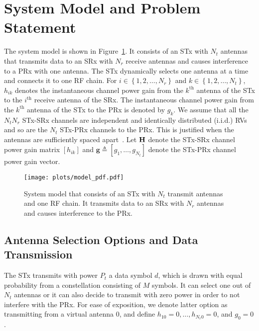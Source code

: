 \documentclass[12pt,draftcls,peerreview,onecolumn]{IEEEtran}
\newcommand{\define}{\triangleq}
\newcommand{\mtx}[1]{{\bf #1}} %
\newcommand{\nx}{{0}}
\newcommand{\Nt}{{N_t}}
\newcommand{\Nr}{{N_r}}
\newcommand{\Pt}{{P_t}}
\newcommand{\such}{h}
\newcommand{\puch}{g}
\newcommand{\hk}[1]{{\such_{#1}}}
\newcommand{\gk}[1]{{\puch_{#1}}}
\newcommand{\g}{\mathbf{\puch}}
\newcommand{\antopts}{\left\{1,2,\ldots,\Nt\right\}}
\newcommand{\nropts}{\left\{1,2,\ldots,\Nr\right\}}
\newcommand{\Hmx}{\mtx{H}}
\newcommand{\ith}{i^{\text{th}}}
\newcommand{\kth}{k^{\text{th}}}
\begin{document}
\section{System Model and Problem Statement}
\label{sec:model}
The system model is shown in Figure~\ref{fig:MODEL}. It consists of an STx with $\Nt$ antennas that transmits data to an SRx with $\Nr$ receive antennas and causes interference to a PRx with one antenna. The STx dynamically selects one antenna at a time and connects it to one RF chain. For $i \in \nropts$ and $k \in \antopts$, $\hk{ik}$ denotes the instantaneous channel power gain from the $\kth$ antenna of the STx to the $\ith$ receive antenna of the SRx. The instantaneous channel power gain from the $\kth$ antenna of the STx to the PRx is denoted by $\gk{k}$. We assume that all the $\Nt\Nr$ STx-SRx channels are independent and identically distributed (i.i.d.) RVs and so are the $\Nt$ STx-PRx channels to the PRx. This is justified when the antennas are sufficiently spaced apart~\cite{Fakhan_2014_TSP,Kong_2011_JCN,Sarvendranath_2013_TCOM,Hanif_2015_globecom}. Let $\Hmx$ denote the STx-SRx channel power gain matrix $\left[\hk{ik}\right]$ and $\g\define\left[\gk{1},\ldots,\gk{\Nt}\right]$ denote the STx-PRx channel power gain vector.

\begin{figure}
\centering 
\texttt{[image: plots/model\_pdf.pdf]}
\caption{System model that consists of an STx with $\Nt$ transmit antennas and one RF chain. It transmits data to an SRx with $\Nr$ antennas and causes interference to the PRx.}
\label{fig:MODEL}
\end{figure}

\newcommand{\hs}{\mathbf{\such}_{s}}
\newcommand{\bhk}[1]{\mathbf{\such}_{#1}}
\newcommand{\hsstar}{\mathbf{\such}_{s^{*}}}
\newcommand{\datasymbol}{d}

\subsection{Antenna Selection Options and Data Transmission}
The STx transmits with power $\Pt$ a data symbol $\datasymbol$, which is drawn with equal probability from a constellation consisting of $M$ symbols. It can select one out of $\Nt$ antennas or it can also decide to transmit with zero power in order to not interfere with the PRx. For ease of exposition, we denote latter option as transmitting from a virtual antenna $\nx$, and define $\hk{1\nx} = 0,\ldots,\hk{\Nr\nx} = 0$, and $\gk{\nx}= 0$. 
\end{document}
